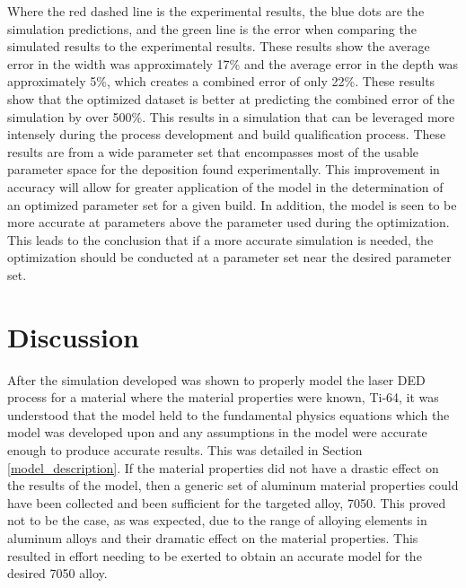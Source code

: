 \documentclass[metals,article,accept,pdftex,moreauthors]{Definitions/mdpi}
\begin{document}
Where the red dashed line is the experimental results, the blue dots are the simulation predictions, and the green line is the error when comparing the simulated results to the experimental results.
These results show the average error in the width was approximately 17\% and the average error in the depth was approximately 5\%, which creates a combined error of only 22\%.  These results show that the optimized dataset is better at predicting the combined error of the simulation by over 500\%.  This results in a simulation that can be leveraged more intensely during the process development and build qualification process.  
These results are from a wide parameter set that encompasses most of the usable 
parameter space for the deposition found experimentally.  This improvement in accuracy 
will 
allow for greater application of the model in the determination of an optimized 
parameter set for a given build.  In addition, the model is seen to be more accurate at 
parameters above the parameter used during the optimization.  This leads to the 
conclusion that if a more accurate simulation is needed, the optimization should be 
conducted at a parameter set near the desired parameter set.

\section{Discussion}
\label{sec:disucssion}
\label{discussion}

After the simulation developed was shown to properly model the laser \ac{DED} process for a material where the material properties were known, Ti-64, it was understood that the model held to the fundamental physics equations which the model was developed upon and any assumptions in the model were accurate enough to produce accurate results.  This was detailed in Section \ref{model_description}. 
If the material properties did not have a drastic effect on the results of the model, then a 
generic set of aluminum material properties could have been collected and been sufficient 
for the targeted alloy, 7050.  This proved not to be the case, as was expected, due to the 
range of alloying elements in aluminum alloys and their dramatic effect on the material 
properties.  This resulted in effort needing to be exerted to obtain an accurate model for 
the desired 7050 alloy.
\end{document}
